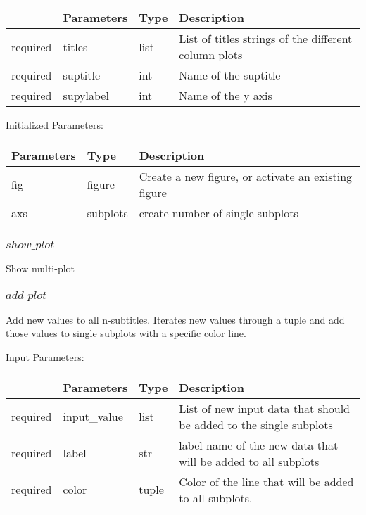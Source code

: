 \documentclass[
	ngerman,
	accentcolor=9c,%
	type=intern,
	marginpar=false
	]{tudapub}
\begin{document}
\begin{tabular}{|p{}|p{}|p{}| p{}|}
\hline
 & \textbf{Parameters} & \textbf{Type} & \textbf{Description} \\
\hline
required & titles & list & List of titles strings of the different column plots \\
\hline
required & suptitle & int & Name of the suptitle \\
\hline
required & supylabel & int & Name of the y axis \\
\hline
\end{tabular}

\vspace{0.5cm}
\noindent Initialized Parameters:
\vspace{0.5cm}

\begin{tabular}{|p{}| p{}| p{}|}
\hline
\textbf{Parameters} & \textbf{Type} & \textbf{Description} \\
\hline
fig & figure & Create a new figure, or activate an existing figure \\
\hline
axs & subplots & create number of single subplots \\
\hline
\end{tabular}
\vspace{1cm}

\subsubsection{$show\_plot$}
\noindent Show multi-plot


\vspace{1cm}

\subsubsection{$add\_plot$}
\noindent Add new values to all n-subtitles. Iterates new values through a tuple and add those values to single subplots with a specific color line. 


\vspace{0.5cm}
\noindent Input Parameters:
\vspace{0.5cm}

\begin{tabular}{|p{}|p{}|p{}| p{}|}
\hline
 & \textbf{Parameters} & \textbf{Type} & \textbf{Description} \\
\hline
required & input\_value & list & List of new input data that should be added to the single subplots \\
\hline
required & label & str & label name of the new data that will be added to all subplots \\
\hline
required & color & tuple & Color of the line that will be added to all subplots. \\
\hline
\end{tabular}
\end{document}
